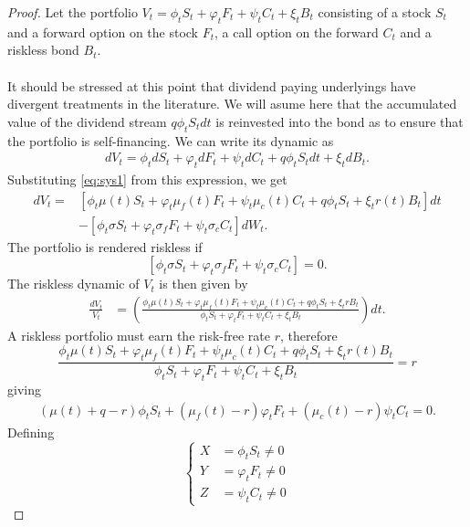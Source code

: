 \documentclass{article}
\theoremstyle{definition}
\theoremstyle{remark}
\begin{document}
\begin{proof}
Let the portfolio $V_t=\phi_tS_t+\varphi_t F_t + \psi_t C_t + \xi_t B_t$ consisting of a stock $S_t$ and a forward option on the stock $F_t$, a call option on the forward $C_t$ and a riskless bond $B_t$.\\
\\
It should be stressed at this point that dividend paying underlyings have divergent treatments in the literature. We will asume here that the accumulated value of the dividend stream $q\phi_tS_tdt$ is reinvested into the bond as to ensure that the portfolio is self-financing. We can write its dynamic as
\begin{align*}
dV_t=\phi_t dS_t+\varphi_t dF_t + \psi_t dC_t+q\phi_tS_tdt+\xi_t dB_t.
\end{align*}
Substituting \eqref{eq:sys1} from this expression, we get
\begin{align*}
dV_t=&\left[ \phi_t\mu(t)S_t+\varphi_t\mu_f(t)F_t+\psi_t\mu_c(t)C_t+q\phi_t S_t+\xi_tr(t)B_t \right]dt\\
&-\left[ \phi_t \sigma S_t+\varphi_t\sigma_f F_t+\psi_t\sigma_c C_t \right]dW_t.
\end{align*}
The portfolio is rendered riskless if 
\begin{equation}\label{eq:condone}
\left[ \phi_t \sigma S_t+\varphi_t\sigma_f F_t+\psi_t\sigma_c C_t \right]=0.
\end{equation}
The riskless dynamic of $V_t$ is then given by
\begin{align*}
\frac{dV_t}{V_t}&=\left(\frac{\phi_t\mu(t)S_t+\varphi_t\mu_f(t)F_t+\psi_t\mu_c(t)C_t+q\phi_t S_t+\xi_tr B_t}{\phi_tS_t+\varphi_t F_t + \psi_t C_t + \xi_t B_t}\right)dt.
\end{align*}
A riskless portfolio must earn the risk-free rate $r$, therefore
\begin{equation}\label{eq:condtwo}
\frac{\phi_t\mu(t)S_t+\varphi_t\mu_f(t)F_t+\psi_t\mu_c(t)C_t+q\phi_t S_t+\xi_tr(t)B_t}{\phi_tS_t+\varphi_t F_t + \psi_t C_t + \xi_t B_t}=r
\end{equation}
giving
\begin{align*}
(\mu(t)+q-r)\phi_tS_t+(\mu_f(t)-r)\varphi_t F_t+(\mu_c(t)-r)\psi_t C_t=0.
\end{align*}
Defining
\begin{equation*}
\left\{ \begin{array}{rc}
			X&=\phi_tS_t\neq 0\\
			Y&=\varphi_t F_t\neq 0\\
			Z&=\psi_t C_t\neq 0

\end{array}
\end{equation*}
\end{proof}
\end{document}

